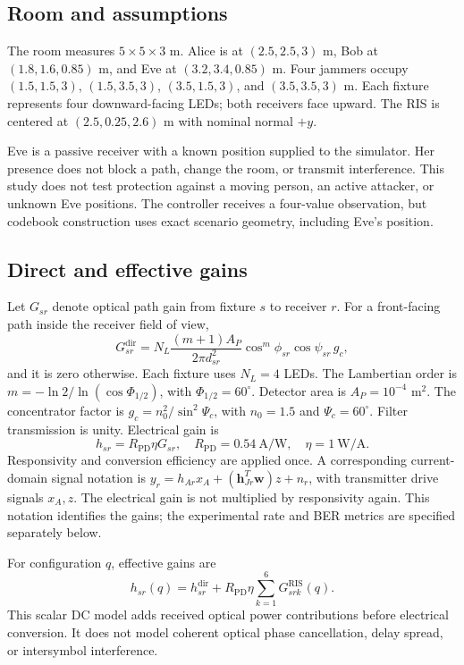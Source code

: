 \documentclass[journal,10pt,twocolumn]{IEEEtran}
\begin{document}
\subsection{Room and assumptions}
The room measures $5\times5\times3$ m. Alice is at $(2.5,2.5,3)$ m, Bob at $(1.8,1.6,0.85)$ m, and Eve at $(3.2,3.4,0.85)$ m. Four jammers occupy $(1.5,1.5,3)$, $(1.5,3.5,3)$, $(3.5,1.5,3)$, and $(3.5,3.5,3)$ m. Each fixture represents four downward-facing LEDs; both receivers face upward. The RIS is centered at $(2.5,0.25,2.6)$ m with nominal normal $+y$.

Eve is a passive receiver with a known position supplied to the simulator. Her presence does not block a path, change the room, or transmit interference. This study does not test protection against a moving person, an active attacker, or unknown Eve positions. The controller receives a four-value observation, but codebook construction uses exact scenario geometry, including Eve's position.

\subsection{Direct and effective gains}
Let $G_{sr}$ denote optical path gain from fixture $s$ to receiver $r$. For a front-facing path inside the receiver field of view,
\begin{equation}
G_{sr}^{\mathrm{dir}}=N_L\frac{(m+1)A_P}{2\pi d_{sr}^2}
\cos^m\phi_{sr}\cos\psi_{sr}\,g_c,

\end{equation}
and it is zero otherwise. Each fixture uses $N_L=4$ LEDs. The Lambertian order is $m=-\ln2/\ln(\cos\Phi_{1/2})$, with $\Phi_{1/2}=60^\circ$. Detector area is $A_P=10^{-4}$ m$^2$. The concentrator factor is $g_c=n_0^2/\sin^2\Psi_c$, with $n_0=1.5$ and $\Psi_c=60^\circ$. Filter transmission is unity. Electrical gain is
\begin{equation}
h_{sr}=R_{\mathrm{PD}}\eta G_{sr},\quad
R_{\mathrm{PD}}=0.54\ {\mathrm{A/W}},\quad\eta=1\ {\mathrm{W/A}}.

\end{equation}
Responsivity and conversion efficiency are applied once. A corresponding current-domain signal notation is $y_r=h_{Ar}x_A+(\mathbf{h}_{Jr}^{T}\mathbf{w})z+n_r$, with transmitter drive signals $x_A,z$. The electrical gain is not multiplied by responsivity again. This notation identifies the gains; the experimental rate and BER metrics are specified separately below.

For configuration $q$, effective gains are
\begin{equation}
h_{sr}(q)=h_{sr}^{\mathrm{dir}}
+R_{\mathrm{PD}}\eta\sum_{k=1}^{6}G_{srk}^{\mathrm{RIS}}(q).

\end{equation}
This scalar DC model adds received optical power contributions before electrical conversion. It does not model coherent optical phase cancellation, delay spread, or intersymbol interference.
\end{document}
